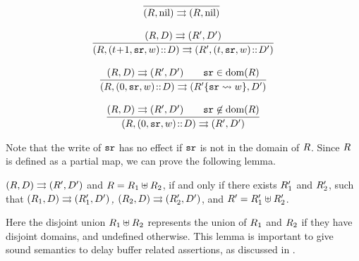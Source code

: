 {\small
$$
\begin{array}{c}
\!\!
\infer
{\Dstep{(\RFile, \nil)}{(\RFile,\nil)}}
{}
\\
\\
%
%
\infer
{\Dstep{(\RFile, (\tick\!+\!1, \sr, \word)\dbCons\DBuf)}
       {(\RFile', (\tick, \sr, \word)\dbCons\DBuf')}}
{\Dstep{(\RFile, \DBuf)}{(\RFile', \DBuf')}}
\\
\\
\infer
{\Dstep{(\RFile, (0, \sr, \word)\dbCons\DBuf)}{(\fsubst{\RFile'}\sr\word, \DBuf')}}
{\Dstep{(\RFile, \DBuf)}{(\RFile', \DBuf')}
\qquad \sr\in\dom(\RFile)
}
%
\\
\\
%
\infer
{\Dstep{(\RFile, (0, \sr, \word)\dbCons\DBuf)}{(\RFile', \DBuf')}}
{\Dstep{(\RFile, \DBuf)}{(\RFile', \DBuf')}
 \qquad \sr\not\in\dom(\RFile)
}
\end{array}
$$
}

Note that the write of $\texttt{sr}$ has no effect if $\texttt{sr}$ is not
in the domain of $R$. Since $R$ is defined as a partial
map, we can prove the following lemma.
\begin{lemma}
	\label{lemma:RFileSplitExDelay}
	{\em ${(R, D)}\rightrightarrows{(R', D')}$}
    and {\em $R = R_1 \uplus R_2$},
    if and only if
    there exists {\em $R_1'$} and {\em $R_2'$}, such that
    {\em ${(R_1, D)}\rightrightarrows{(R_1', D')}$, ${(R_2, D)}\rightrightarrows{(R_2', D')}$},
    and {\em $R' = R_1' \uplus R_2'$}.
\end{lemma}
Here the disjoint union $R_1 \uplus R_2$ represents the union of
$R_1$ and $R_2$ if they have disjoint domains, and undefined
otherwise. This lemma is important to give sound semantics
to delay buffer related assertions, as discussed in
\Sec{\ref{sec:logic}}.



